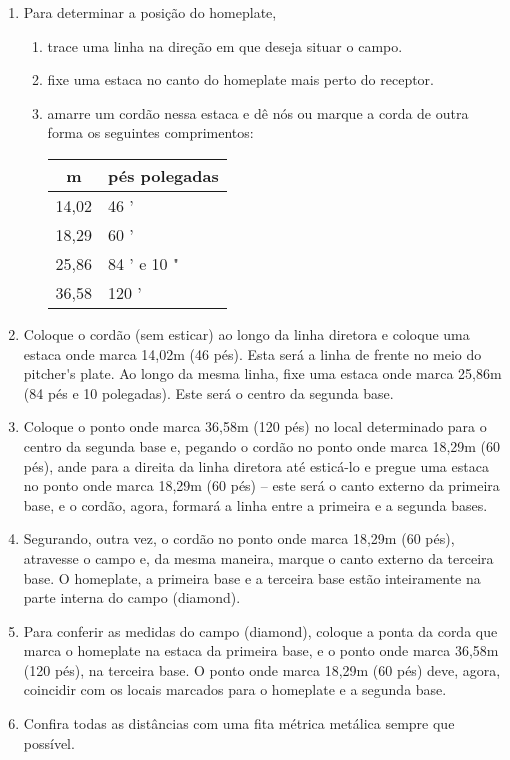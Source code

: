 \begin{enumerate}[label = (\arabic*)]


\item   Para determinar a posição do \gls{homeplate},
\begin{enumerate}
	\item trace uma linha na direção em que deseja situar o campo.
	\item fixe uma estaca no canto do \gls{homeplate} mais perto do receptor.
	\item amarre um cordão nessa estaca e dê nós ou marque a corda de outra forma %
	os seguintes comprimentos:

\begin{center}
	\begin{tabular}{c|l}\hline
		m & pés polegadas\\\hline
		14,02 &46 '\\\hline
		18,29 &60 '\\\hline
		25,86 &84 ' e 10 \textonequarter{} " \\\hline
		36,58 &120 '\\\hline
	\end{tabular}
\end{center}


\end{enumerate}

\item   Coloque o cordão (sem esticar) ao longo da linha diretora e coloque uma estaca onde marca 14,02m (46 pés). Esta será a linha de frente no meio do \gls{pitcher's plate}. Ao longo da mesma linha, fixe uma estaca onde marca 25,86m (84 pés e 10 \textonequarter{} polegadas). Este será o centro da segunda base.

\item  Coloque o ponto onde marca 36,58m (120 pés) no local determinado para o centro da segunda base e, pegando o cordão no ponto onde marca 18,29m (60 pés), ande para a direita da linha diretora até esticá-lo e pregue uma estaca no ponto onde marca 18,29m (60 pés) -- este será o canto externo da primeira base, e o cordão, agora, formará a linha entre a primeira e a segunda bases.

\item  Segurando, outra vez, o cordão no ponto onde marca 18,29m (60 pés), atravesse o campo e, da mesma maneira, marque o canto externo da terceira base. O \gls{homeplate}, a primeira base e a terceira base estão inteiramente na parte interna do campo (\gls{diamond}).
\item  Para conferir as medidas do campo (\gls{diamond}), coloque a ponta da corda que marca o \gls{homeplate} na estaca da primeira base, e o ponto onde marca 36,58m (120 pés), na terceira base. O ponto onde marca 18,29m (60 pés) deve, agora, coincidir com os locais marcados para o \gls{homeplate} e a segunda base.
\item  Confira todas as distâncias com uma fita métrica metálica sempre que possível.
\end{enumerate}


